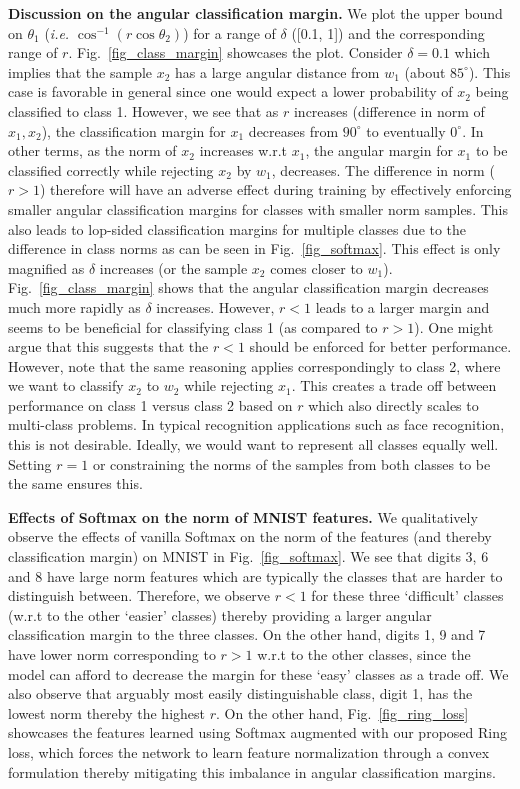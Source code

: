 \documentclass[10pt,twocolumn,letterpaper]{article}
\begin{document}
\textbf{Discussion on the angular classification margin. }  We plot the upper bound on $\theta_1$ (\emph{i.e.} $\cos ^{-1}( r \cos \theta_2)$) for a range of $\delta$ ([0.1, 1]) and the corresponding range of $r$. Fig.~\ref{fig_class_margin} showcases the plot. Consider $\delta=0.1$ which implies that the sample $x_2$ has a large angular distance from $w_1$ (about $85^\circ$). This case is favorable in general since one would expect a lower probability of $x_2$ being classified to class 1. However, we see that as $r$ increases (difference in norm of $x_1, x_2$), the classification margin for $x_1$ decreases from $90^\circ$ to eventually $0^\circ$. In other terms, as the norm of $x_2$ increases w.r.t $x_1$, the angular margin for $x_1$ to be classified correctly while rejecting $x_2$ by $w_1$, decreases. The difference in norm ($r>1$) therefore will have an adverse effect during training by effectively enforcing smaller angular classification margins for classes with smaller norm samples. This also leads to lop-sided classification margins for multiple classes due to the difference in class norms as can be seen in Fig.~\ref{fig_softmax}. This effect is only magnified as $\delta$ increases (or the sample $x_2$ comes closer to $w_1$). Fig.~\ref{fig_class_margin} shows that the angular classification margin decreases much more rapidly as $\delta$ increases. However, $r<1$ leads to a larger margin and seems to be beneficial for classifying class 1 (as compared to $r>1$). One might argue that this suggests that the $r<1$ should be enforced for better performance. However, note that the same reasoning applies correspondingly to class 2, where we want to classify $x_2$ to $w_2$ while rejecting $x_1$. This creates a trade off between performance on class 1 versus class 2 based on $r$ which also directly scales to multi-class problems. In typical recognition applications such as face recognition, this is not desirable. Ideally, we would want to represent all classes equally well. Setting $r=1$ or constraining the norms of the samples from both classes to be the same ensures this.

\textbf{Effects of Softmax on the norm of MNIST features.} We qualitatively observe the effects of vanilla Softmax on the norm of the features (and thereby classification margin) on MNIST in Fig.~\ref{fig_softmax}. We see that digits 3, 6 and 8 have large norm features which are typically the classes that are harder to distinguish between. Therefore, we observe $r<1$ for these three `difficult' classes (w.r.t to the other `easier' classes) thereby providing a larger angular classification margin to the three classes. On the other hand, digits 1, 9 and 7 have lower norm corresponding to $r>1$ w.r.t to the other classes, since the model can afford to decrease the margin for these `easy' classes as a trade off. We also observe that arguably most easily distinguishable class, digit 1, has the lowest norm thereby the highest $r$. On the other hand, Fig.~\ref{fig_ring_loss} showcases the features learned using Softmax augmented with our proposed Ring loss, which forces the network to learn feature normalization through a convex formulation thereby mitigating this imbalance in angular classification margins. 
\end{document}

